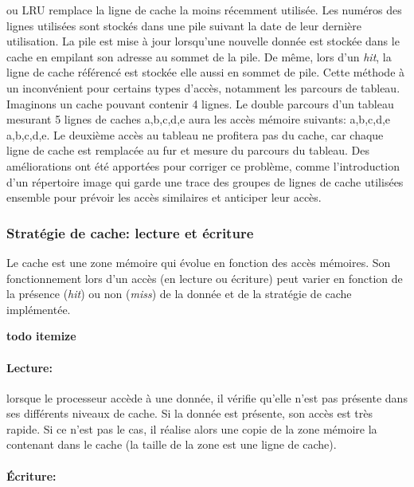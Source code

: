             ou LRU remplace la ligne de cache la moins récemment utilisée. Les numéros des lignes utilisées sont stockés dans une pile suivant la date de leur dernière utilisation. La pile est mise à jour lorsqu'une nouvelle donnée est stockée dans le cache en empilant son adresse au sommet de la pile. De même, lors d'un \textit{hit}, la ligne de cache référencé est stockée elle aussi en sommet de pile. Cette méthode à un inconvénient pour certains types d'accès, notamment les parcours de tableau. Imaginons un cache pouvant contenir 4 lignes. Le double parcours d'un tableau mesurant 5 lignes de caches a,b,c,d,e aura les accès mémoire suivants: a,b,c,d,e a,b,c,d,e. Le deuxième accès au tableau ne profitera pas du cache, car chaque ligne de cache est remplacée au fur et mesure du parcours du tableau. Des améliorations ont été apportées pour corriger ce problème, comme l'introduction d'un répertoire image \cite{Stone:1987:HCA:31845} qui garde une trace des groupes de lignes de cache utilisées ensemble pour prévoir les accès similaires et anticiper leur accès.

    
    \subsubsection{Stratégie de cache: lecture et écriture}

        Le cache est une zone mémoire qui évolue en fonction des accès mémoires. Son fonctionnement lors d'un accès (en lecture ou écriture) peut varier en fonction de la présence (\textit{hit}) ou non (\textit{miss}) de la donnée et de la stratégie de cache implémentée.
        
        \textbf{todo itemize}
        \paragraph{Lecture:}  
            
            lorsque le processeur accède à une donnée, il vérifie qu'elle n'est pas présente dans ses différents niveaux de cache. Si la donnée est présente, son accès est très rapide. Si ce n'est pas le cas, il réalise alors une copie de la zone mémoire la contenant dans le cache (la taille de la zone est une ligne de cache).
        
        \paragraph{Écriture:} 
        
